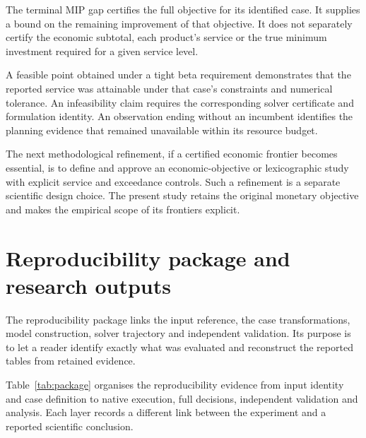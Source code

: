 \documentclass[11pt,a4paper]{article}
\begin{document}
The terminal MIP gap certifies the full objective for its identified case. It supplies a bound on the remaining improvement of that objective. It does not separately certify the economic subtotal, each product's service or the true minimum investment required for a given service level.

A feasible point obtained under a tight beta requirement demonstrates that the reported service was attainable under that case's constraints and numerical tolerance. An infeasibility claim requires the corresponding solver certificate and formulation identity. An observation ending without an incumbent identifies the planning evidence that remained unavailable within its resource budget.

The next methodological refinement, if a certified economic frontier becomes essential, is to define and approve an economic-objective or lexicographic study with explicit service and exceedance controls. Such a refinement is a separate scientific design choice. The present study retains the original monetary objective and makes the empirical scope of its frontiers explicit.

\section{Reproducibility package and research outputs}
\label{app:reproducibility}

The reproducibility package links the input reference, the case transformations, model construction, solver trajectory and independent validation. Its purpose is to let a reader identify exactly what was evaluated and reconstruct the reported tables from retained evidence.

Table~\ref{tab:package} organises the reproducibility evidence from input identity and case definition to native execution, full decisions, independent validation and analysis. Each layer records a different link between the experiment and a reported scientific conclusion.
\end{document}
